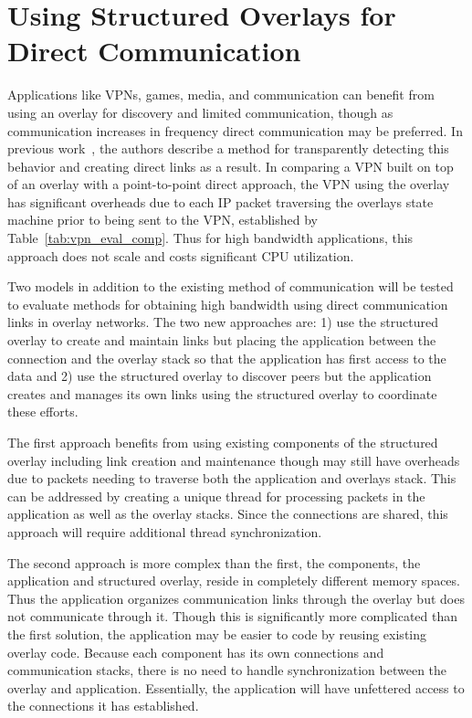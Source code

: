 \section{Using Structured Overlays for Direct Communication}
\label{direct_communication}
Applications like VPNs, games, media, and communication can benefit from using
an overlay for discovery and limited communication, though as communication
increases in frequency direct communication may be preferred.  In previous
work~\cite{wow}, the authors describe a method for transparently detecting this
behavior and creating direct links as a result.  In comparing a VPN built on
top of an overlay with a point-to-point direct approach, the VPN using the
overlay has significant overheads due to each IP packet traversing the overlays
state machine prior to being sent to the VPN, established by
Table~\ref{tab:vpn_eval_comp}.  Thus for high bandwidth applications, this
approach does not scale and costs significant CPU utilization.

Two models in addition to the existing method of communication will be tested
to evaluate methods for obtaining high bandwidth using direct communication
links in overlay networks.  The two new approaches are:  1) use the structured
overlay to create and maintain links but placing the application between the
connection and the overlay stack so that the application has first access to
the data and 2) use the structured overlay to discover peers but the
application creates and manages its own links using the structured overlay to
coordinate these efforts.  %

The first approach benefits from using existing components of the structured
overlay including link creation and maintenance though may still have overheads
due to packets needing to traverse both the application and overlays stack.
This can be addressed by creating a unique thread for processing packets in the
application as well as the overlay stacks.  Since the connections are shared,
this approach will require additional thread synchronization.

The second approach is more complex than the first, the components, the
application and structured overlay, reside in completely different memory
spaces.  Thus the application organizes communication links through the overlay
but does not communicate through it.  Though this is significantly more
complicated than the first solution, the application may be easier to code by
reusing existing overlay code.  Because each component has its own connections
and communication stacks, there is no need to handle synchronization between
the overlay and application.  Essentially, the application will have unfettered
access to the connections it has established.

